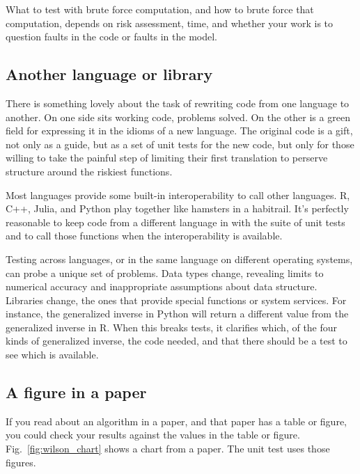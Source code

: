 \documentclass[fleqn,10pt]{olplainarticle}
\begin{document}
What to test with brute force computation, and how to brute
force that computation, depends on risk assessment, time, and
whether your work is to question faults in the code or faults
in the model.



\subsection{Another language or library}

There is something lovely about the task of rewriting code from
one language to another. On one side sits working code, problems
solved. On the other is a green field for expressing it in the idioms
of a new language. The original code is a gift, not only as a guide,
but as a set of unit tests for the new code, but only for those
willing to take the painful step of limiting their first translation
to perserve structure around the riskiest functions.

Most languages provide some built-in interoperability to call
other languages. R, C++, Julia, and Python play together like hamsters
in a habitrail. It's perfectly reasonable to keep code from
a different language in with the suite of unit tests and to
call those functions when the interoperability is available.

Testing across languages, or in the same language on different
operating systems, can probe a unique set of problems. Data types
change, revealing limits to numerical accuracy and inappropriate
assumptions about data structure. Libraries change, the ones that
provide special functions or system services. For instance, the
generalized inverse in Python will return a different value
from the generalized inverse in R. When this breaks tests, it
clarifies which, of the four kinds of generalized inverse,
the code needed, and that there should be a test to see which
is available.


\subsection{A figure in a paper}
If you read about an algorithm in a paper, and that paper has a table or figure,
you could check your results against the values in the table or figure.
Fig.~\ref{fig:wilson_chart} shows a chart from a paper. The unit test
uses those figures.
\end{document}
